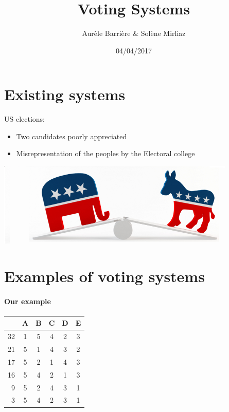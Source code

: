 \documentclass[utf8]{earlywinter}
\title{Voting Systems}
\author{Aur\`ele Barri\`ere \& Sol\`ene Mirliaz}
\date{04/04/2017}
\begin{document}
\begin{frame}
\maketitle
\end{frame}

\section{Existing systems}
\begin{frame}{\secname}
  US elections:
  \begin{itemize}
    \item Two candidates poorly appreciated
    \item Misrepresentation of the peoples by the Electoral college
  \end{itemize}
  \begin{center}
    \includegraphics[width=\linewidth]{us.png}
  \end{center}
  
\end{frame}

\section{Examples of voting systems}
\begin{frame}{\secname}
  \framesubtitle{Our example}
  \centering
  \begin{tabular}{r | c c c c c |}
       & A & B & C & D & E \\ \hline
    32 & 1 & 5 & 4 & 2 & 3 \\
    21 & 5 & 1 & 4 & 3 & 2 \\
    17 & 5 & 2 & 1 & 4 & 3 \\
    16 & 5 & 4 & 2 & 1 & 3 \\
    9  & 5 & 2 & 4 & 3 & 1 \\
    3  & 5 & 4 & 2 & 3 & 1 \\ \hline
  \end{tabular}
\end{frame}
\end{document}
